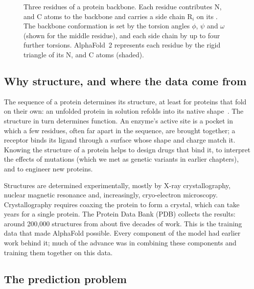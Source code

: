 \begin{figure}[!htbp]
  \caption{Three residues of a protein backbone. Each residue contributes N, \Ca{} and C atoms to the backbone and carries a side chain R$_i$ on its \Ca. The backbone conformation is set by the torsion angles $\phi$, $\psi$ and $\omega$ (shown for the middle residue), and each side chain by up to four further torsions. AlphaFold~2 represents each residue by the rigid triangle of its N, \Ca{} and C atoms (shaded).}
  \label{fig:backbone}
\end{figure}

\subsection{Why structure, and where the data come from}

The sequence of a protein determines its structure, at least for proteins that fold on their own: an unfolded protein in solution refolds into its native shape~\citep{anfinsen1973}. The structure in turn determines function. An enzyme's active site is a pocket in which a few residues, often far apart in the sequence, are brought together; a receptor binds its ligand through a surface whose shape and charge match it. Knowing the structure of a protein helps to design drugs that bind it, to interpret the effects of mutations (which we met as genetic variants in earlier chapters), and to engineer new proteins.

Structures are determined experimentally, mostly by X-ray crystallography, nuclear magnetic resonance and, increasingly, cryo-electron microscopy. Crystallography requires coaxing the protein to form a crystal, which can take years for a single protein. The Protein Data Bank (PDB) collects the results: around 200,000 structures from about five decades of work. This is the training data that made AlphaFold possible. Every component of the model had earlier work behind it; much of the advance was in combining these components and training them together on this data.

\subsection{The prediction problem}

